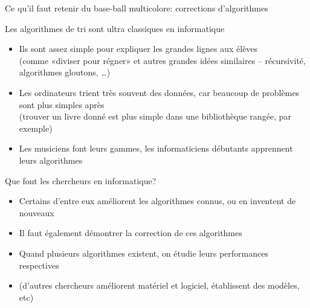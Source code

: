 \begin{frame}{Ce qu'il faut retenir du base-ball multicolore: corrections d'algorithmes}
  \begin{block}{Les algorithmes de tri sont ultra classiques en informatique}
    \begin{itemize}
    \item Ils sont assez simple pour expliquer les grandes lignes aux élèves\\
      (comme «diviser pour régner» et autres grandes idées similaires -- récursivité, algorithmes gloutons, \ldots)
    \item Les ordinateurs trient très souvent des données, car beaucoup de problèmes sont plus simples après\\
      (trouver un livre donné est plus simple dans une bibliothèque rangée, par exemple)
    \item \alert{Les musiciens font leurs gammes, les informaticiens débutants
      apprennent leurs algorithmes}
    \end{itemize}
  \end{block}

  \begin{block}{Que font les chercheurs en informatique?}
    \begin{itemize}
    \item Certains d'entre eux améliorent les algorithmes connus, ou en
      inventent de nouveaux
    \item Il faut également démontrer la correction de ces algorithmes
    \item Quand plusieurs algorithmes existent, on étudie leurs \alert{performances} respectives
    \item (d'autres chercheurs améliorent matériel et logiciel, établissent des
      modèles, etc)
    \end{itemize}
  \end{block}
\end{frame}

